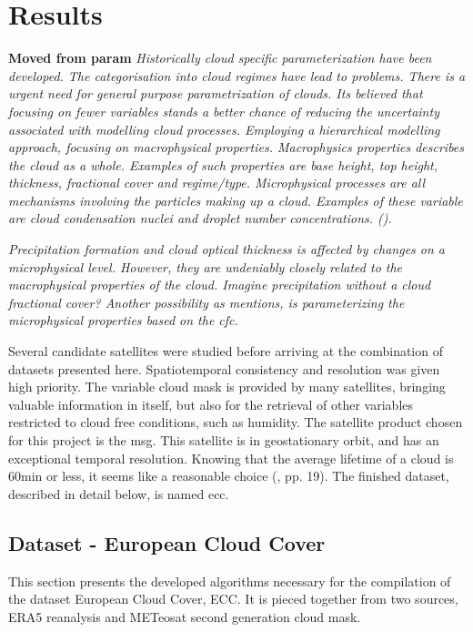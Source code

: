 \chapter{Results}
\textbf{Moved from param} \textit{Historically cloud specific parameterization have been developed. The categorisation into cloud regimes have lead to problems. There is a urgent need for general purpose parametrization of clouds. Its believed that focusing on fewer variables stands a better chance of reducing the uncertainty associated with modelling cloud processes. Employing a hierarchical modelling approach, focusing on macrophysical properties. Macrophysics properties describes the cloud as a whole. Examples of such properties are base height, top height, thickness, fractional cover and regime/type. Microphysical processes are all mechanisms involving the particles making up a cloud. Examples of these variable are cloud condensation nuclei and droplet number concentrations. (\cite{Grabowski2019ModelingBetter}).
}

\textit{Precipitation formation and cloud optical thickness is affected by changes on a microphysical level. However, they are undeniably closely related to the macrophysical properties of the cloud. Imagine precipitation without a cloud fractional cover? Another possibility as \cite{Fowler1996LiquidAssumptions} mentions, is parameterizing the microphysical properties based on the \acrshort{cfc}.}

Several candidate satellites were studied before arriving at the combination of datasets presented here. Spatiotemporal consistency and resolution was given high priority. 
The variable cloud mask is provided by many satellites, bringing valuable information in itself, but also for the retrieval of other variables restricted to cloud free conditions, such as humidity. The satellite product chosen for this project is the \acrfull{msg}. This satellite is in geostationary orbit, and has an exceptional temporal resolution. Knowing that the average lifetime of a cloud is 60min or less, it seems like a reasonable choice (\cite{lohmann2016}, pp. 19). The finished dataset, described in detail below, is named \acrfull{ecc}.

\section{Dataset - European Cloud Cover }
This section presents the developed algorithms necessary for the compilation of the dataset European Cloud Cover, ECC. It is pieced together from two sources, ERA5 reanalysis and METeosat second generation cloud mask. %

